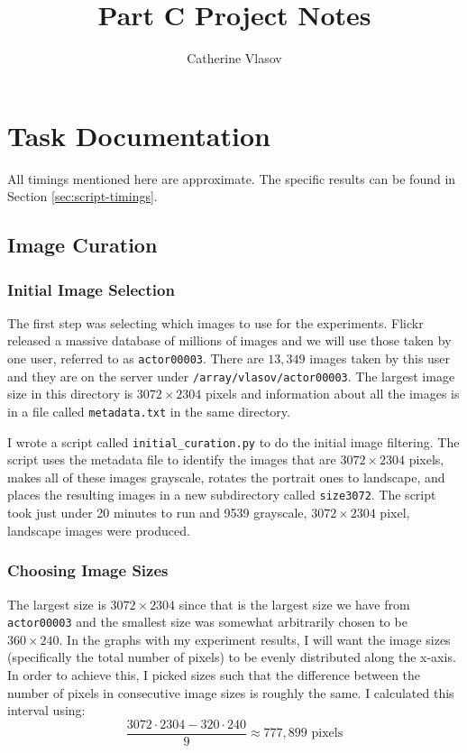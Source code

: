 \documentclass[11pt,a4paper]{report}
\begin{document}
\title{Part C Project Notes}
\author{Catherine Vlasov}
\maketitle

\tableofcontents


\chapter{Task Documentation}

All timings mentioned here are approximate. The specific results can be found in Section \ref{sec:script-timings}.

\section{Image Curation}

\subsection{Initial Image Selection}
\label{subsec:initial-image-selection}

The first step was selecting which images to use for the experiments. Flickr released a massive database of millions of images and we will use those taken by one user, referred to as \texttt{actor00003}. There are $13,349$ images taken by this user and they are on the server under \texttt{/array/vlasov/actor00003}. The largest image size in this directory is $3072\times2304$ pixels and information about all the images is in a file called \texttt{metadata.txt} in the same directory.

I wrote a script called \texttt{initial\_curation.py} to do the initial image filtering. The script uses the metadata file to identify the images that are $3072\times2304$ pixels, makes all of these images grayscale, rotates the portrait ones to landscape, and places the resulting images in a new subdirectory called \texttt{size3072}. The script took just under 20 minutes to run and 9539 grayscale, $3072\times2304$ pixel, landscape images were produced.


\subsection{Choosing Image Sizes}
\label{subsec:image-sizes}

The largest size is $3072\times2304$ since that is the largest size we have from \texttt{actor00003} and the smallest size was somewhat arbitrarily chosen to be $360\times240$. In the graphs with my experiment results, I will want the image sizes (specifically the total number of pixels) to be evenly distributed along the x-axis. In order to achieve this, I picked sizes such that the difference between the number of pixels in consecutive image sizes is roughly the same. I calculated this interval using:
\begin{equation*}
\frac{3072 \cdot 2304 - 320 \cdot 240}{9} \approx 777,899 \text{ pixels}
\end{equation*}
\end{document}
